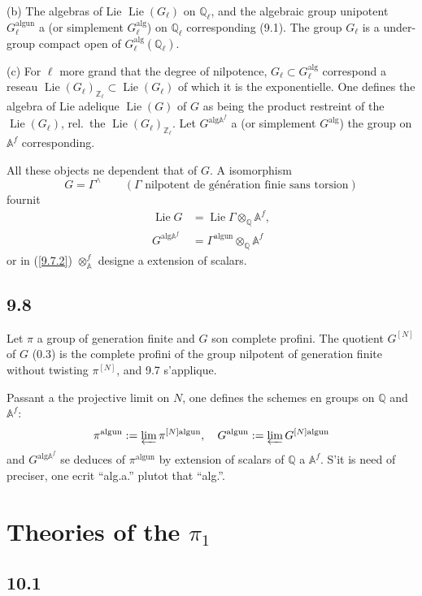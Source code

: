 \documentclass[12pt,a4paper]{article}
\theoremstyle{plain}
\theoremstyle{definition}
\theoremstyle{remark}
\DeclareMathOperator{\Lie}{Lie}
\newcommand{\Q}{\mathbb{Q}}
\newcommand{\Z}{\mathbb{Z}}
\newcommand{\Af}{\mathbb{A}^f}
\newcommand{\alg}{\mathrm{alg}}
\newcommand{\un}{\mathrm{un}}
\begin{document}
(b) The algebras of Lie $\Lie(G_\ell)$ on $\Q_\ell$, and the algebraic group unipotent $G_\ell^{\alg \un}$ a (or simplement $G_\ell^{\alg}$) on $\Q_\ell$ corresponding (9.1). The group $G_\ell$ is a under-group compact open of $G_\ell^{\alg}(\Q_\ell)$.

(c) For $\ell$ more grand that the degree of nilpotence, $G_\ell \subset G_\ell^{\alg}$ correspond a reseau $\Lie(G_\ell)_{\Z_\ell} \subset \Lie(G_\ell)$ of which it is the exponentielle. One defines the algebra of Lie adelique $\Lie(G)$ of $G$ as being the product restreint of the $\Lie(G_\ell)$, rel.~the $\Lie(G_\ell)_{\Z_\ell}$. Let $G^{\alg \Af}$ a (or simplement $G^{\alg}$) the group on $\Af$ corresponding.

All these objects ne dependent that of $G$. A isomorphism
$$G = \Gamma^\wedge \qquad (\Gamma \text{ nilpotent de g\'en\'eration finie sans torsion})$$
fournit
\begin{align}
\Lie G &= \Lie \Gamma \otimes_\Q \Af, \label{9.7.1} \\
G^{\alg \Af} &= \Gamma^{\alg \un} \otimes_\Q \Af \label{9.7.2}
\end{align}
or in (\ref{9.7.2}) $\otimes_\Af$ designe a extension of scalars.

\subsection*{9.8}

Let $\pi$ a group of generation finite and $G$ son complete profini. The quotient $G^{[N]}$ of $G$ (0.3) is the complete profini of the group nilpotent of generation finite without twisting $\pi^{[N]}$, and 9.7 s'applique.

Passant a the projective limit on $N$, one defines the schemes en groups on $\Q$ and $\Af$:
$$\pi^{\alg \un} := \varprojlim \pi^{[N] \alg \un}, \quad G^{\alg \un} := \varprojlim G^{[N] \alg \un}$$
and $G^{\alg \Af}$ se deduces of $\pi^{\alg \un}$ by extension of scalars of $\Q$ a $\Af$. S'it is need of preciser, one ecrit ``alg.a.'' plutot that ``alg.''.



\section{Theories of the $\pi_1$}

\subsection*{10.1}
\end{document}
